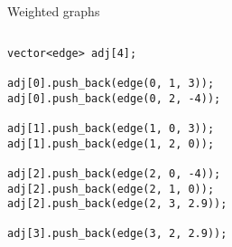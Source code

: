 \documentclass[12pt,t]{beamer}
\begin{document}
\begin{frame}[fragile]{Weighted graphs}
    \begin{columns}[T]
        \begin{column}{.4\textwidth}
            \begin{verbatim}
vector<edge> adj[4];

adj[0].push_back(edge(0, 1, 3));
adj[0].push_back(edge(0, 2, -4));

adj[1].push_back(edge(1, 0, 3));
adj[1].push_back(edge(1, 2, 0));

adj[2].push_back(edge(2, 0, -4));
adj[2].push_back(edge(2, 1, 0));
adj[2].push_back(edge(2, 3, 2.9));

adj[3].push_back(edge(3, 2, 2.9));

            \end{verbatim}
        \end{column}%
        \hfill%
        \begin{column}{.6\textwidth}
            \begin{figure}
            \end{figure}
        \end{column}%
    \end{columns}
\end{frame}
\end{document}
